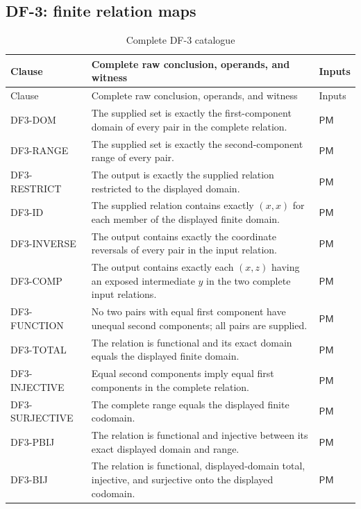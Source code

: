 \documentclass[11pt,twoside]{article}
\begin{document}
\subsection{DF-3: finite relation maps}\label{sec:df3}

\begin{longtable}{>{\raggedright\arraybackslash}p{}
                  >{\raggedright\arraybackslash}p{}
                  >{\raggedright\arraybackslash}p{}}
\caption{Complete DF-3 catalogue}\label{tab:df3}\\
\toprule
Clause & Complete raw conclusion, operands, and witness & Inputs\\
\midrule
\endfirsthead%
\toprule
Clause & Complete raw conclusion, operands, and witness & Inputs\\
\midrule
\endhead%
DF3-DOM & The supplied set is exactly the first-component domain of every pair in
the complete relation. & \(\mathsf{PM}\)\\
DF3-RANGE & The supplied set is exactly the second-component range of every pair.
& \(\mathsf{PM}\)\\
DF3-RESTRICT & The output is exactly the supplied relation restricted to the
displayed domain. & \(\mathsf{PM}\)\\
DF3-ID & The supplied relation contains exactly \((x,x)\) for each member of the
displayed finite domain. & \(\mathsf{PM}\)\\
DF3-INVERSE & The output contains exactly the coordinate reversals of every pair
in the input relation. & \(\mathsf{PM}\)\\
DF3-COMP & The output contains exactly each \((x,z)\) having an exposed
intermediate \(y\) in the two complete input relations. & \(\mathsf{PM}\)\\
DF3-FUNCTION & No two pairs with equal first component have unequal second
components; all pairs are supplied. & \(\mathsf{PM}\)\\
DF3-TOTAL & The relation is functional and its exact domain equals the displayed
finite domain. & \(\mathsf{PM}\)\\
DF3-INJECTIVE & Equal second components imply equal first components in the
complete relation. & \(\mathsf{PM}\)\\
DF3-SURJECTIVE & The complete range equals the displayed finite codomain. &
\(\mathsf{PM}\)\\
DF3-PBIJ & The relation is functional and injective between its exact displayed
domain and range. & \(\mathsf{PM}\)\\
DF3-BIJ & The relation is functional, displayed-domain total, injective, and
surjective onto the displayed codomain. & \(\mathsf{PM}\)\\
\bottomrule
\end{longtable}
\end{document}
